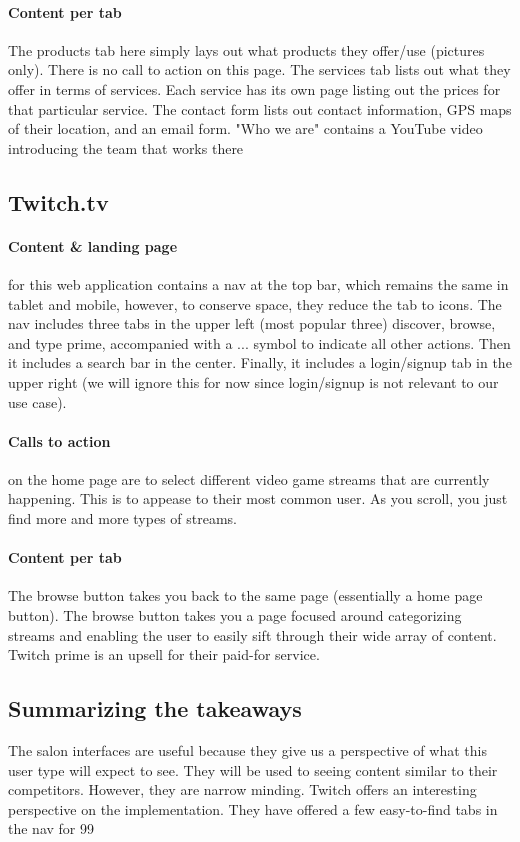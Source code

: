 \paragraph{Content per tab}
The products tab here simply lays out what products they offer/use (pictures only). There is no call to action on this page. The services tab lists out what they offer in terms of services. Each service has its own page listing out the prices for that particular service. The contact form lists out contact information, GPS maps of their location, and an email form. "Who we are" contains a YouTube video introducing the team that works there

\subsection{Twitch.tv}

\paragraph{Content & landing page}
for this web application contains a nav at the top bar, which remains the same in tablet and mobile, however, to conserve space, they reduce the tab to icons. The nav includes three tabs in the upper left (most popular three) discover, browse, and type prime, accompanied with a ... symbol to indicate all other actions. Then it includes a search bar in the center. Finally, it includes a login/signup tab in the upper right (we will ignore this for now since login/signup is not relevant to our use case).

\paragraph{Calls to action}
on the home page are to select different video game streams that are currently happening. This is to appease to their most common user. As you scroll, you just find more and more types of streams.

\paragraph{Content per tab}
The browse button takes you back to the same page (essentially a home page button). The browse button takes you a page focused around categorizing streams and enabling the user to easily sift through their wide array of content. Twitch prime is an upsell for their paid-for service.

\subsection{Summarizing the takeaways}
The salon interfaces are useful because they give us a perspective of what this user type will expect to see. They will be used to seeing content similar to their competitors. However, they are narrow minding. Twitch offers an interesting perspective on the implementation. They have offered a few easy-to-find tabs in the nav for 99%

